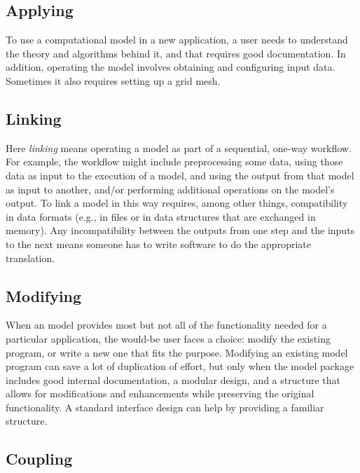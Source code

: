 \documentclass[12pt]{amsart}
\begin{document}
\subsection{Applying}

To use a computational model in a new application, a user needs to understand the theory and algorithms behind it, and that requires good documentation. In addition, operating the model involves obtaining and configuring input data. Sometimes it also requires setting up a grid mesh.

\subsection{Linking}

Here \textit{linking} means operating a model as part of a sequential, one-way workflow. For example, the workflow might include preprocessing some data, using those data as input to the execution of a model, and using the output from that model as input to another, and/or performing additional operations on the model's output. To link a model in this way requires, among other things, compatibility in data formats (e.g., in files or in data structures that are exchanged in memory). Any incompatibility between the outputs from one step and the inputs to the next means someone has to write software to do the appropriate translation.

\subsection{Modifying}

When an model provides most but not all of the functionality needed for a particular application, the would-be user faces a choice: modify the existing program, or write a new one that fits the purpose. Modifying an existing model program can save a lot of duplication of effort, but only when the model package includes good internal documentation, a modular design, and a structure that allows for modifications and enhancements while preserving the original functionality. A standard interface design can help by providing a familiar structure.

\subsection{Coupling}
\end{document}
